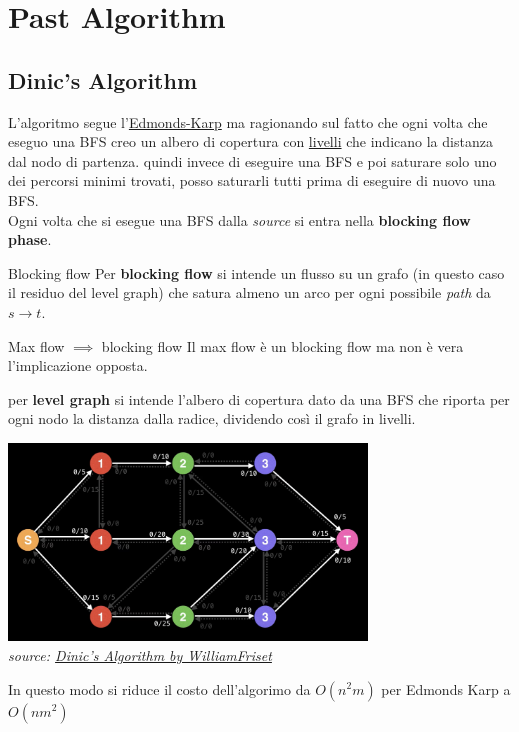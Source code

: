 \documentclass[a4paper, 11pt]{report}
\begin{document}
\chapter{Past Algorithm}
\section{Dinic's Algorithm}
\label{dnc}
L'algoritmo segue l'\href{https://en.wikipedia.org/wiki/Edmonds%E2%80%93Karp_algorithm}{Edmonds-Karp} ma ragionando sul fatto che ogni volta che eseguo una BFS creo un albero di copertura con \underline{livelli} che indicano la distanza dal nodo di partenza.
quindi invece di eseguire una BFS e poi saturare solo uno dei percorsi minimi trovati, posso saturarli tutti prima di eseguire di nuovo una BFS.\\
Ogni volta che si esegue una BFS dalla \textit{source} si entra nella \textbf{blocking flow phase}.\\
\begin{definition}{Blocking flow}{}
    Per \textbf{blocking flow} si intende un flusso su un grafo (in questo caso il residuo del level graph) che satura almeno un arco per ogni possibile \textit{path} da $s\rightarrow t$.    
\end{definition}
\begin{obs}{Max flow $\implies$ blocking flow}{}
    Il max flow è un blocking flow ma non è vera l'implicazione opposta.
\end{obs}
per \textbf{level graph} si intende l'albero di copertura dato da una BFS che riporta per ogni nodo la distanza dalla radice, dividendo così il grafo in livelli.
\begin{center}
    \includegraphics[height=5.25cm]{images/levelGraph.png}\\
    \textit{source: \href{https://www.youtube.com/watch?v=M6cm8UeeziI&t=2s}{Dinic's Algorithm by WilliamFriset}}
\end{center}
In questo modo si riduce il costo dell'algorimo da $O(n^2m)$ per Edmonds Karp a $O(nm^2)$
\end{document}
